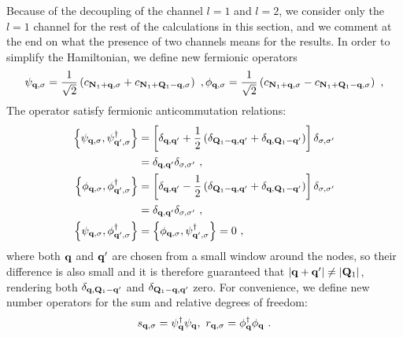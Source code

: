 Because of the decoupling of the channel \(l=1\) and \(l=2\), we consider only the \(l=1\) channel for the rest of the calculations in this section, and we comment at the end on what the presence of two channels means for the results. In order to simplify the Hamiltonian, we define new fermionic operators
\begin{equation}\begin{aligned}
	\psi_{{\bf q}, \sigma} = \frac{1}{\sqrt 2}\left(c_{{\bf N}_1 + {\bf q},\sigma} + c_{{\bf N}_1 + {\bf Q}_1 - {\bf q}, \sigma}\right)~,
	\phi_{{\bf q}, \sigma} = \frac{1}{\sqrt 2}\left(c_{{\bf N}_1 + {\bf q},\sigma} - c_{{\bf N}_1 + {\bf Q}_1 - {\bf q}, \sigma}\right)~,
\end{aligned}\end{equation}
The operator satisfy fermionic anticommutation relations:
\begin{equation}\begin{aligned}
	\left\{ \psi_{{\bf q},\sigma}, {\psi}^\dagger_{{\bf q}^\prime,\sigma} \right\} &= \left[\delta_{{\bf q}, {\bf q}^\prime} + \frac{1}{2}\left(\delta_{{\bf Q}_1 - {\bf q}, {\bf q}^\prime} + \delta_{{\bf q}, {\bf Q}_1 - {\bf q}^\prime}\right)  \right] \delta_{\sigma,\sigma^\prime} \\
																							   &= \delta_{{\bf q}, {\bf q}^\prime}\delta_{\sigma,\sigma^\prime}~,\\
	\left\{ \phi_{{\bf q},\sigma}, {\phi}^\dagger_{{\bf q}^\prime,\sigma} \right\} &= \left[\delta_{{\bf q}, {\bf q}^\prime} - \frac{1}{2}\left(\delta_{{\bf Q}_1 - {\bf q}, {\bf q}^\prime} + \delta_{{\bf q}, {\bf Q}_1 - {\bf q}^\prime}\right)  \right] \delta_{\sigma,\sigma^\prime} \\
																				  &= \delta_{{\bf q}, {\bf q}^\prime}\delta_{\sigma,\sigma^\prime}~,\\
	\left\{ \psi_{{\bf q},\sigma}, {\phi}^\dagger_{{\bf q}^\prime,\sigma} \right\} &= \left\{ \phi_{{\bf q},\sigma}, {\psi}^\dagger_{{\bf q}^\prime,\sigma} \right\} = 0~,
\end{aligned}\end{equation}
where both \({\bf q}\) and \({\bf q}^\prime\) are chosen from a small window around the nodes, so their difference is also small and it is therefore guaranteed that \(|{\bf q} + {\bf q}^\prime| \neq |{\bf Q}_1|\), rendering both \(\delta_{{\bf q}, {\bf Q}_1 - {\bf q}^\prime}\) and \(\delta_{{\bf Q}_1 - {\bf q}, {\bf q}^\prime}\) zero. For convenience, we define new number operators for the sum and relative degrees of freedom:
\begin{equation}\begin{aligned}
	s_{{\bf q},\sigma} = {\psi}^\dagger_{{\bf q}} {\psi}_{{\bf q}},~ r_{{\bf q},\sigma} = {\phi}^\dagger_{{\bf q}} {\phi}_{{\bf q}}~.
\end{aligned}\end{equation}
